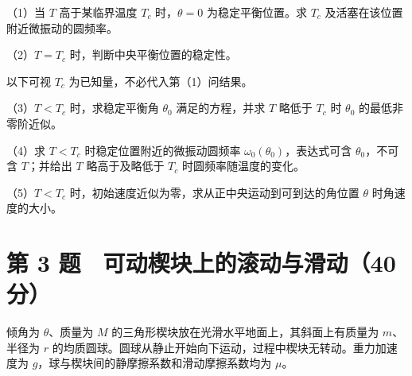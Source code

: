 \documentclass[12pt,a4paper,fontset=fandol]{ctexart}
\begin{document}
（1）当 \(T\) 高于某临界温度 \(T_c\) 时，\(\theta=0\) 为稳定平衡位置。求
\(T_c\) 及活塞在该位置附近微振动的圆频率。

（2）\(T=T_c\) 时，判断中央平衡位置的稳定性。

以下可视 \(T_c\) 为已知量，不必代入第（1）问结果。

（3）\(T<T_c\) 时，求稳定平衡角 \(\theta_0\) 满足的方程，并求 \(T\)
略低于 \(T_c\) 时 \(\theta_0\) 的最低非零阶近似。

（4）求 \(T<T_c\) 时稳定位置附近的微振动圆频率
\(\omega_0(\theta_0)\)，表达式可含 \(\theta_0\)，不可含 \(T\)；并给出
\(T\) 略高于及略低于 \(T_c\) 时圆频率随温度的变化。

（5）\(T<T_c\) 时，初始速度近似为零，求从正中央运动到可到达的角位置
\(\theta\) 时角速度的大小。

\clearpage

\section{第 3
题　可动楔块上的滚动与滑动（40分）}\label{ux7b2c-3-ux9898-ux53efux52a8ux6954ux5757ux4e0aux7684ux6edaux52a8ux4e0eux6ed1ux52a840ux5206}

倾角为 \(\theta\)、质量为 \(M\)
的三角形楔块放在光滑水平地面上，其斜面上有质量为 \(m\)、半径为 \(r\)
的均质圆球。圆球从静止开始向下运动，过程中楔块无转动。重力加速度为
\(g\)，球与楔块间的静摩擦系数和滑动摩擦系数均为 \(\mu\)。

\begin{center}
\begin{minipage}{\linewidth}
\centering\begingroup{}
\ifdim\wd\diagrambox>.88\linewidth
\sbox{\diagrambox}{\resizebox{.88\linewidth}{!}{\usebox{\diagrambox}}}\fi
\ifdim\ht\diagrambox>.38\textheight
\resizebox{!}{.38\textheight}{\usebox{\diagrambox}}
\else\usebox{\diagrambox}\fi
\par{}\endgroup\end{minipage}\end{center}
\end{document}
